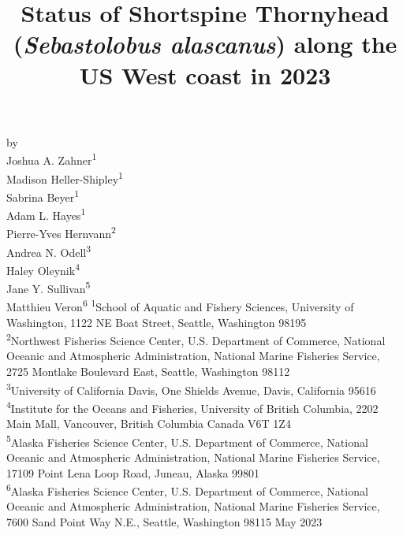 \documentclass[11pt,
  english,
  letterpaper,
]{article}
\date{}
\newcommand{\trTitle}{Status of Shortspine Thornyhead (\emph{Sebastolobus alascanus}) along the US West coast in 2023}
\newcommand{\trYear}{2023}
\newcommand{\trMonth}{May}
\newcommand\includegraphicsifexists[2][width=\linewidth]{\IfFileExists{#2}{\texttt{[image: \#2]}}{}}
\begin{document}

\renewcommand*{\thefootnote}{\fnsymbol{footnote}}

\small
\thispagestyle{empty}
\noindent
\begin{center}
\title{Status of Shortspine Thornyhead (\emph{Sebastolobus alascanus}) along the US West coast in 2023}
\vspace{1.5cm}
{\Large\textbf{}}

\includegraphicsifexists[width=4in]{figure_title.png}
\vfill
by\\
Joshua A. Zahner\textsuperscript{1}\\
Madison Heller-Shipley\textsuperscript{1}\\
Sabrina Beyer\textsuperscript{1}\\
Adam L. Hayes\textsuperscript{1}\\
Pierre-Yves Hernvann\textsuperscript{2}\\
Andrea N. Odell\textsuperscript{3}\\
Haley Oleynik\textsuperscript{4}\\
Jane Y. Sullivan\textsuperscript{5}\\
Matthieu Veron\textsuperscript{6}\vfill
\textsuperscript{1}School of Aquatic and Fishery Sciences, University of Washington, 1122 NE Boat Street, Seattle, Washington 98195\\
\textsuperscript{2}Northwest Fisheries Science Center, U.S. Department of Commerce, National Oceanic and Atmospheric Administration, National Marine Fisheries Service, 2725 Montlake Boulevard East, Seattle, Washington 98112\\
\textsuperscript{3}University of California Davis, One Shields Avenue, Davis, California 95616\\
\textsuperscript{4}Institute for the Oceans and Fisheries, University of British Columbia, 2202 Main Mall, Vancouver, British Columbia Canada V6T 1Z4\\
\textsuperscript{5}Alaska Fisheries Science Center, U.S. Department of Commerce, National Oceanic and Atmospheric Administration, National Marine Fisheries Service, 17109 Point Lena Loop Road, Juneau, Alaska 99801\\
\textsuperscript{6}Alaska Fisheries Science Center, U.S. Department of Commerce, National Oceanic and Atmospheric Administration, National Marine Fisheries Service, 7600 Sand Point Way N.E., Seattle, Washington 98115\vfill
\trMonth{} \trYear{}
\end{center}
\clearpage
\end{document}
